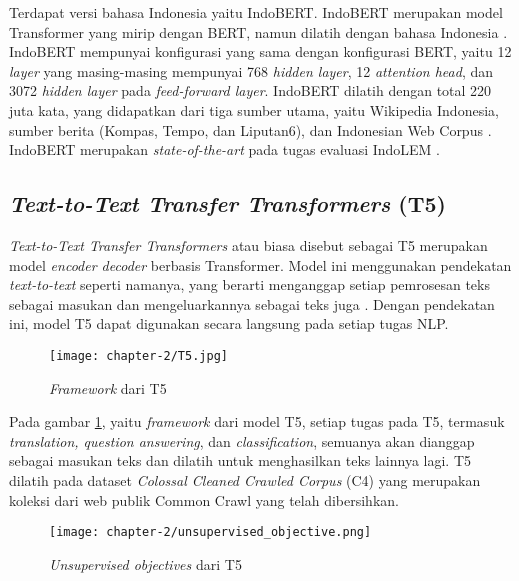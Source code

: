 Terdapat versi bahasa Indonesia yaitu IndoBERT. IndoBERT merupakan model Transformer yang mirip dengan BERT, namun dilatih dengan bahasa Indonesia \parencite{indolem}. IndoBERT mempunyai konfigurasi yang sama dengan konfigurasi BERT, yaitu 12 \textit{layer} yang masing-masing mempunyai 768 \textit{hidden layer}, 12 \textit{attention head}, dan 3072 \textit{hidden layer} pada \textit{feed-forward layer}. IndoBERT dilatih dengan total 220 juta kata, yang didapatkan dari tiga sumber utama, yaitu Wikipedia Indonesia, sumber berita (Kompas, Tempo, dan Liputan6), dan Indonesian Web Corpus \parencite{indolem}. IndoBERT merupakan \textit{state-of-the-art} pada tugas evaluasi IndoLEM \parencite{indolem}.

\subsection{\textit{Text-to-Text Transfer Transformers} (T5)}

\textit{Text-to-Text Transfer Transformers} atau biasa disebut sebagai T5 merupakan model \textit{encoder decoder} berbasis Transformer. Model ini menggunakan pendekatan \textit{text-to-text} seperti namanya, yang berarti menganggap setiap pemrosesan teks sebagai masukan dan mengeluarkannya sebagai teks juga \parencite{T5}. Dengan pendekatan ini, model T5 dapat digunakan secara langsung pada setiap tugas NLP.

\begin{figure}[ht]
    \vspace{0.25cm}
    \centering
    \texttt{[image: chapter-2/T5.jpg]}
    \caption{\textit{Framework} dari T5 \parencite{T5}}
    \label{fig:T5}
\end{figure}

Pada gambar \ref{fig:T5}, yaitu \textit{framework} dari model T5, setiap tugas pada T5, termasuk \textit{translation, question answering}, dan \textit{classification}, semuanya akan dianggap sebagai masukan teks dan dilatih untuk menghasilkan teks lainnya lagi. T5 dilatih pada dataset \textit{Colossal Cleaned Crawled Corpus} (C4) yang merupakan koleksi dari web publik Common Crawl yang telah dibersihkan.

\begin{figure}[ht]
    \vspace{0.25cm}
    \centering
    \texttt{[image: chapter-2/unsupervised\_objective.png]}
    \caption{\textit{Unsupervised objectives} dari T5 \parencite{T5}}
    \label{fig:unsupervised-T5}
\end{figure}

